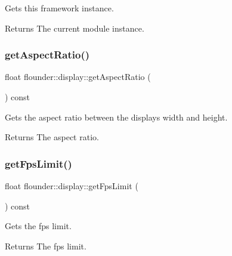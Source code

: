 Gets this framework instance. 

\begin{DoxyReturn}{Returns}
The current module instance. 
\end{DoxyReturn}
\mbox{\label{classflounder_1_1display_a0c49110ba02af920bc83ac6c851ed931}} 
\subsubsection{\texorpdfstring{get\+Aspect\+Ratio()}{getAspectRatio()}}
{\footnotesize\ttfamily float flounder\+::display\+::get\+Aspect\+Ratio (\begin{DoxyParamCaption}{ }\end{DoxyParamCaption}) const\hspace{0.3cm}{\ttfamily [inline]}}



Gets the aspect ratio between the displays width and height. 

\begin{DoxyReturn}{Returns}
The aspect ratio. 
\end{DoxyReturn}
\mbox{\label{classflounder_1_1display_a2b18a6a0f62f5a265b390cac5cc923a3}} 
\subsubsection{\texorpdfstring{get\+Fps\+Limit()}{getFpsLimit()}}
{\footnotesize\ttfamily float flounder\+::display\+::get\+Fps\+Limit (\begin{DoxyParamCaption}{ }\end{DoxyParamCaption}) const\hspace{0.3cm}{\ttfamily [inline]}}



Gets the fps limit. 

\begin{DoxyReturn}{Returns}
The fps limit. 
\end{DoxyReturn}
\mbox{\label{classflounder_1_1display_a93c0ecfc2d7fdca87f881f0989a001a9}} 
